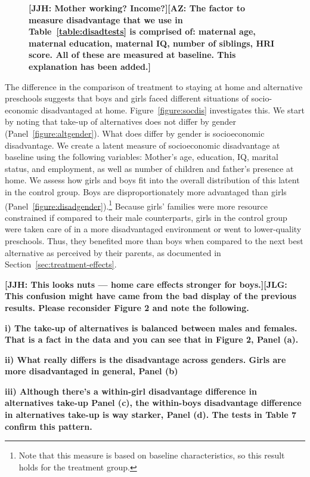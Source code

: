 \begin{figure}
\textbf{[JJH: Mother working? Income?][AZ: The factor to measure disadvantage that we use in Table~\ref{table:disadtests} is comprised of: maternal age, maternal education, maternal IQ, number of siblings, HRI score. All of these are measured at baseline. This explanation has been added.]}
\end{figure}

The difference in the comparison of treatment to staying at home and alternative preschools suggests that boys and girls faced different situations of socio-economic disadvantaged at home. Figure~\ref{figure:socdis} investigates this. We start by noting that take-up of alternatives does not differ by gender (Panel~\ref{figure:altgender}). What does differ by gender is socioeconomic disadvantage. We create a latent measure of socioeconomic disadvantage at baseline using the following variables: Mother's age, education, IQ, marital status, and employment, as well as number of children and father's presence at home. We assess how girls and boys fit into the overall distribution of this latent in the control group. Boys are disproportionately more advantaged than girls (Panel~\ref{figure:disadgender}).\footnote{Note that this measure is based on baseline characteristics, so this result holds for the treatment group.} Because girls' families were more resource constrained if compared to their male counterparts, girls in the control group were taken care of in a more disadvantaged environment or went to lower-quality preschools. Thus, they benefited more than boys when compared to the next best alternative as perceived by their parents, as documented in Section~\ref{sec:treatment-effects}.

 \textbf{[JJH: This looks nuts --- home care effects stronger for boys.][JLG: This confusion might have came from the bad display of the previous results. Please reconsider Figure 2 and note the following.}

 \textbf{i) The take-up of alternatives is balanced between males and females. That is a fact in the data and you can see that in Figure 2, Panel (a).}

 \textbf{ii) What really differs is the disadvantage across genders. Girls are more disadvantaged in general, Panel (b)}

 \textbf{iii) Although there's a within-girl disadvantage difference in alternatives take-up Panel (c), the within-boys disadvantage difference in alternatives take-up is way starker, Panel (d). The tests in Table 7 confirm this pattern.}

